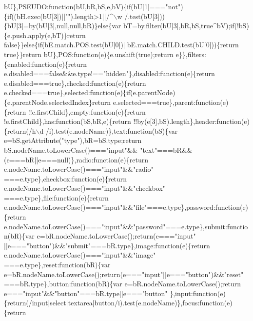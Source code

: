 \begin{DoxyCode}
{       bU\},PSEUDO:function(bU,bR,bS,e,bV)\{if(bU[1]==="}not\textcolor{stringliteral}{")\{if((bH.exec(bU[3])||"}\textcolor{stringliteral}{").length>1||/^\(\backslash\)w
      /.test(bU[3]))\{bU[3]=by(bU[3],null,null,bR)\}else\{var bT=by.filter(bU[3],bR,bS,true^bV);if(!bS)\{e.push.apply(e,bT)\}return
       false\}\}else\{if(bE.match.POS.test(bU[0])||bE.match.CHILD.test(bU[0]))\{return true\}\}return bU\},POS:function(e)\{e.unshift(true);return
       e\}\},filters:\{enabled:function(e)\{return e.disabled===false&&e.type!=="}hidden\textcolor{stringliteral}{"\},disabled:function(e)\{return
       e.disabled===true\},checked:function(e)\{return
       e.checked===true\},selected:function(e)\{if(e.parentNode)\{e.parentNode.selectedIndex\}return e.selected===true\},parent:function(e)\{return !!e.firstChild\},empty:function(e)\{return
       !e.firstChild\},has:function(bS,bR,e)\{return !!by(e[3],bS).length\},header:function(e)\{return(/h\(\backslash\)d
      /i).test(e.nodeName)\},text:function(bS)\{var e=bS.getAttribute("}type\textcolor{stringliteral}{"),bR=bS.type;return bS.nodeName.toLowerCase()==="}input\textcolor{stringliteral}{"&&
      "}text\textcolor{stringliteral}{"===bR&&(e===bR||e===null)\},radio:function(e)\{return e.nodeName.toLowerCase()==="}input\textcolor{stringliteral}{"&&"}radio\textcolor{stringliteral}{"
      ===e.type\},checkbox:function(e)\{return e.nodeName.toLowerCase()==="}input\textcolor{stringliteral}{"&&"}checkbox\textcolor{stringliteral}{"
      ===e.type\},file:function(e)\{return e.nodeName.toLowerCase()==="}input\textcolor{stringliteral}{"&&"}file\textcolor{stringliteral}{"===e.type\},password:function(e)\{return
       e.nodeName.toLowerCase()==="}input\textcolor{stringliteral}{"&&"}password\textcolor{stringliteral}{"===e.type\},submit:function(bR)\{var e=bR.nodeName.toLowerCase();return(e==="}input\textcolor{stringliteral}{"
      ||e==="}button\textcolor{stringliteral}{")&&"}submit\textcolor{stringliteral}{"===bR.type\},image:function(e)\{return e.nodeName.toLowerCase()==="}input\textcolor{stringliteral}{"&&"}image\textcolor{stringliteral}{"
      ===e.type\},reset:function(bR)\{var e=bR.nodeName.toLowerCase();return(e==="}input\textcolor{stringliteral}{"||e==="}button\textcolor{stringliteral}{")&&"}reset\textcolor{stringliteral}{"
      ===bR.type\},button:function(bR)\{var e=bR.nodeName.toLowerCase();return e==="}input\textcolor{stringliteral}{"&&"}button\textcolor{stringliteral}{"===bR.type||e==="}button\textcolor{stringliteral}{"
      \},input:function(e)\{return(/input|select|textarea|button/i).test(e.nodeName)\},focus:function(e)\{return
}
\end{DoxyCode}

